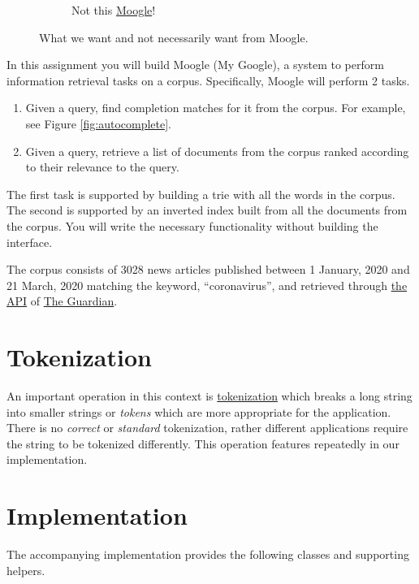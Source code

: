 \documentclass[addpoints]{exam}
\begin{document}
\begin{figure}
\begin{subfigure}{.2\textwidth}
    \caption{Not this \href{https://finalfantasy.fandom.com/wiki/Final_Fantasy_Wiki}{Moogle}!}
    \label{fig:moogle}
  \end{subfigure}
  \caption{What we want and not necessarily want from Moogle.}
\end{figure}

In this assignment you will build Moogle (My Google), a system to perform information retrieval tasks on a corpus. Specifically, Moogle will perform 2 tasks.
\begin{enumerate}
\item Given a query, find completion matches for it from the corpus. For example, see Figure \ref{fig:autocomplete}.
\item Given a query, retrieve a list of documents from the corpus ranked according to their relevance to the query.
\end{enumerate}

The first task is supported by building a trie with all the words in the corpus. The second is supported by an inverted index built from all the documents from the corpus. You will write the necessary functionality without building the interface.

The corpus consists of 3028 news articles published between 1 January, 2020 and 21 March, 2020 matching the keyword, ``coronavirus'', and retrieved through \href{https://open-platform.theguardian.com}{the API} of \href{https://www.theguardian.com/}{The Guardian}.

\section{Tokenization}

An important operation in this context is \href{https://nlp.stanford.edu/IR-book/html/htmledition/tokenization-1.html}{tokenization} which breaks a long string into smaller strings or \textit{tokens} which are more appropriate for the application. There is no \textit{correct} or \textit{standard} tokenization, rather different applications require the string to be tokenized differently. This operation features repeatedly in our implementation.

\section{Implementation}

The accompanying implementation provides the following classes and supporting helpers.
\end{document}
